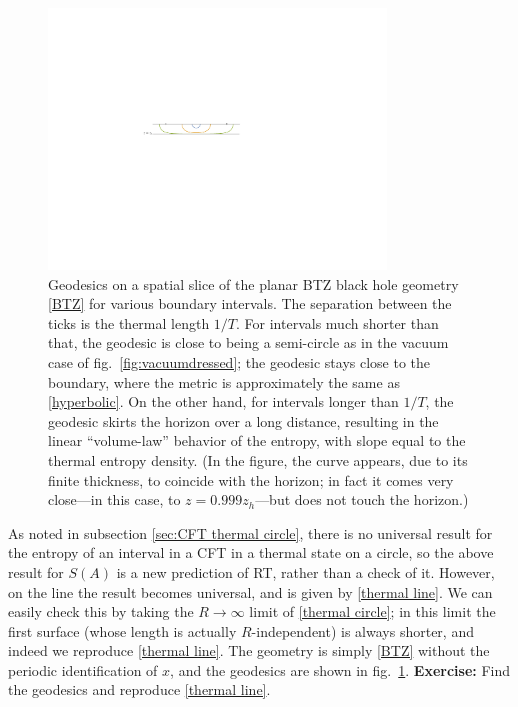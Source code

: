 \documentclass[11pt]{article}
\begin{document}
\begin{figure}[tbp]
\centering
\includegraphics[width=0.8\textwidth]{figs/thermal}
\caption{\label{fig:thermal}
Geodesics on a spatial slice of the planar BTZ black hole geometry \eqref{BTZ} for various boundary intervals. The separation between the ticks is the thermal length $1/T$. For intervals much shorter than that, the geodesic is close to being a semi-circle as in the vacuum case of fig.\ \ref{fig:vacuumdressed}; the geodesic stays close to the boundary, where the metric is approximately the same as \eqref{hyperbolic}. On the other hand, for intervals longer than $1/T$, the geodesic skirts the horizon over a long distance, resulting in the linear ``volume-law'' behavior of the entropy, with slope equal to the thermal entropy density. (In the figure, the curve appears, due to its finite thickness, to coincide with the horizon; in fact it comes very close---in this case, to $z=0.999z_h$---but does not touch the horizon.)
}
\end{figure}

As noted in subsection \ref{sec:CFT thermal circle}, there is no universal result for the entropy of an interval in a CFT in a thermal state on a circle, so the above result for $S(A)$ is a new prediction of RT, rather than a check of it. However, on the line the result becomes universal, and is given by \eqref{thermal line}. We can easily check this by taking the $R\to\infty$ limit of \eqref{thermal circle}; in this limit the first surface (whose length is actually $R$-independent) is always shorter, and indeed we reproduce \eqref{thermal line}. The geometry is simply \eqref{BTZ} without the periodic identification of $x$, and the geodesics are shown in fig.\ \ref{fig:thermal}. {\bf Exercise:} Find the geodesics and reproduce \eqref{thermal line}.
\end{document}
